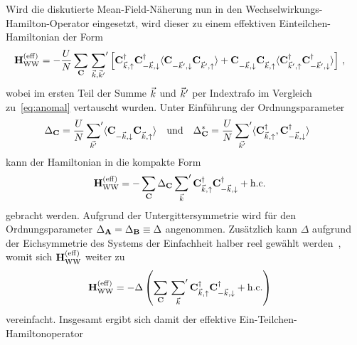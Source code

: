 

Wird die diskutierte Mean-Field-Näherung nun in den Wechselwirkungs-Hamilton-Operator eingesetzt, wird dieser zu einem effektiven Einteilchen-Hamiltonian der Form
\begin{align}
    \oHWWeff &= -\frac{U}{N} \sum_\oC \sump{\vk, \vk'}\left[\ocd{\vk, \up} \ocd{-\vk, \down} \expval{\oc{-\vk', \down} \oc{\vk', \up}} + \ocndd \ocndu \expval{\ocdu \ocdd}\right] \, ,
\end{align}
wobei im ersten Teil der Summe ${\vec{k}}$ und ${\vec{k}}'$ per Indextrafo im Vergleich zu~\eqref{eq:anomal} vertauscht wurden.
Unter Einführung der Ordnungsparameter
\begin{align}
    \Delta_\oC &= \frac{U}{N} \sump{\vec{k'}} \expval{\oc{-\vk, \down} \ocndu} & & \text{und} & \Delta_{\oC}^{*} &= \frac{U}{N} \sump{\vec{k'}} \expval{\ocdup, \ocddown}~\label{eq:def_delta} \,
\end{align}
kann der Hamiltonian in die kompakte Form
\begin{align}
    \mathbf{H}_{\mathrm{WW}}^{(\mathrm{eff})} &= - \sum_\mathbf{C} \Delta_\mathbf{C} \sideset{}{'}\sum_{{\vec{k}}} \mathbf{C}^{\dagger}_{{\vec{k}}, \uparrow} \mathbf{C}^{\dagger}_{-{\vec{k}}, \downarrow} + \text{h.c.}
\end{align}
gebracht werden.
Aufgrund der Untergittersymmetrie wird für den Ordnungsparameter $\Delta_{\mathbf{A}} = \Delta_{\mathbf{B}} \equiv \Delta$ angenommen.
Zusätzlich kann $\Delta$ aufgrund der Eichsymmetrie des Systems der Einfachheit halber reel gewählt werden~\cite[272]{altland_condensed_2012}, womit sich 
$\mathbf{H}_{\mathrm{WW}}^{(\mathrm{eff})}$ weiter zu 
\begin{align}
    \mathbf{H}_{\mathrm{WW}}^{(\mathrm{eff})} &= - \Delta \left(\sum_\mathbf{C} \sideset{}{'}\sum_{{\vec{k}}} \mathbf{C}^{\dagger}_{{\vec{k}}, \uparrow} \mathbf{C}^{\dagger}_{-{\vec{k}}, \downarrow} + \text{h.c.}\right)
\end{align}
vereinfacht. 
Insgesamt ergibt sich damit der effektive Ein-Teilchen-Hamiltonoperator 
